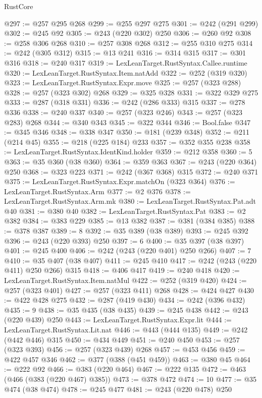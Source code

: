 \begin{lexlean}{RustCore}
\begin{coremodule}
@297 := @257 @295 @268
@299 := @255 @297 @275
@301 := @242 (@291 @299)
@302 := @245 @92
@305 := @243 (@220 @302) @250
@306 := @260 @92
@308 := @258 @306 @268
@310 := @257 @308 @268
@312 := @255 @310 @275
@314 := @242 (@305 @312)
@315 := @13 @241
@316 := @314 @315
@317 := @301 @316
@318 := @240 @317
@319 := LexLeanTarget.RustSyntax.Callee.runtime
@320 := LexLeanTarget.RustSyntax.Item.natAdd
@322 := @252 (@319 @320)
@323 := LexLeanTarget.RustSyntax.Expr.move
@325 := @257 (@323 @288)
@328 := @257 (@323 @302) @268
@329 := @325 @328
@331 := @322 @329 @275
@333 := @287 (@318 @331)
@336 := @242 (@286 @333) @315
@337 := @278 @336
@338 := @240 @337
@340 := @257 (@323 @246)
@343 := @257 (@323 @283) @268
@344 := @340 @343
@345 := @322 @344
@346 := Bool.false
@347 := @345 @346
@348 := @338 @347
@350 := @181 (@239 @348)
@352 := @211 (@214 @45)
@355 := @218 (@225 @184) @233
@357 := @352 @355 @238
@358 := LexLeanTarget.RustSyntax.IdentKind.holder
@359 := @212 @358
@360 := 5
@363 := @35 @360 (@38 @360)
@364 := @359 @363
@367 := @243 (@220 @364) @250
@368 := @323 @223
@371 := @242 (@367 @368) @315
@372 := @240 @371
@375 := LexLeanTarget.RustSyntax.Expr.matchOn (@323 @364)
@376 := LexLeanTarget.RustSyntax.Arm
@377 := @2 @376
@378 := LexLeanTarget.RustSyntax.Arm.mk
@380 := LexLeanTarget.RustSyntax.Pat.adt @40
@381 := @380 @40
@382 := LexLeanTarget.RustSyntax.Pat
@383 := @2 @382
@384 := @383 @229
@385 := @13 @382
@387 := @381 (@384 @385)
@388 := @378 @387
@389 := 8
@392 := @35 @389 (@38 @389)
@393 := @245 @392
@396 := @243 (@220 @393) @250
@397 := 6
@400 := @35 @397 (@38 @397)
@401 := @245 @400
@406 := @242 (@243 (@220 @401) @250 @266)
@407 := 7
@410 := @35 @407 (@38 @407)
@411 := @245 @410
@417 := @242 (@243 (@220 @411) @250 @266) @315
@418 := @406 @417
@419 := @240 @418
@420 := LexLeanTarget.RustSyntax.Item.natMul
@422 := @252 (@319 @420)
@424 := @257 (@323 @401)
@427 := @257 (@323 @411) @268
@428 := @424 @427
@430 := @422 @428 @275
@432 := @287 (@419 @430)
@434 := @242 (@396 @432)
@435 := 9
@438 := @35 @435 (@38 @435)
@439 := @245 @438
@442 := @243 (@220 @439) @250
@443 := LexLeanTarget.RustSyntax.Expr.lit
@444 := LexLeanTarget.RustSyntax.Lit.nat
@446 := @443 (@444 @135)
@449 := @242 (@442 @446) @315
@450 := @434 @449
@451 := @240 @450
@453 := @257 (@323 @393)
@456 := @257 (@323 @439) @268
@457 := @453 @456
@459 := @422 @457 @346
@462 := @377 (@388 (@451 @459))
@463 := @380 @45
@464 := @222 @92
@466 := @383 (@220 @464)
@467 := @222 @135
@472 := @463 (@466 (@383 (@220 @467) @385))
@473 := @378 @472
@474 := 10
@477 := @35 @474 (@38 @474)
@478 := @245 @477
@481 := @243 (@220 @478) @250

\end{coremodule}
\end{lexlean}
